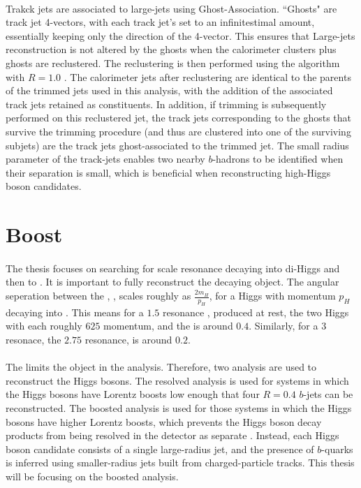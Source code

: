 \paragraph{}
Trakck jets are associated to large-\R jets using Ghost-Association.
``Ghosts" are track jet 4-vectors, with each track jet's \pt set to an infinitestimal amount, essentially keeping only the direction of the 4-vector.
This ensures that Large-\R jets reconstruction is not altered by the ghosts when the calorimeter clusters plus ghosts are reclustered.
The reclustering is then performed using the \akt algorithm with $R=1.0$ .
The calorimeter jets after reclustering are identical to the parents of the trimmed jets used in this analysis, with the addition of the associated track jets retained as constituents.
In addition, if trimming is subsequently performed on this reclustered jet, the track jets corresponding to the ghosts that survive the trimming procedure (and thus are clustered into one of the surviving subjets) are the track jets ghost-associated to the trimmed jet.
The small radius parameter of the track-jets enables two nearby $b$-hadrons to be identified when their \DR separation is small, which is beneficial when reconstructing high-\pt Higgs boson candidates.

\section{Boost}
\paragraph{}
The thesis focuses on searching for \TeV scale resonance decaying into di-Higgs and then to \bbbb. It is important to fully reconstruct the decaying object. The angular seperation between the \bb, \drbb, scales roughly as $\frac{2m_H}{p_{H}}$, for a Higgs with momentum $p_{H}$ decaying into \bb. This means for a $1.5$ \TeV resonance \Grav, produced at rest, the two Higgs with each roughly $625$ \GeV momentum, and the \drbb is around $0.4$. Similarly, for a $3$ \TeV resonace, the $2.75$ \TeV resonance, \drbb is around $0.2$.

\paragraph{}
The \drbb limits the object in the analysis. Therefore, two analysis are used to reconstruct the Higgs bosons. The resolved analysis is used for \hh systems in which the Higgs bosons have Lorentz boosts low enough that four $R=0.4$ $b$-jets can be reconstructed. The boosted analysis is used for those \hh systems in which the Higgs bosons have higher Lorentz boosts, which prevents the Higgs boson decay products from being resolved in the detector as separate \bjets. Instead, each Higgs boson candidate consists of a single large-radius jet, and the presence of $b$-quarks is inferred using smaller-radius jets built from charged-particle tracks. This thesis will be focusing on the boosted analysis.

